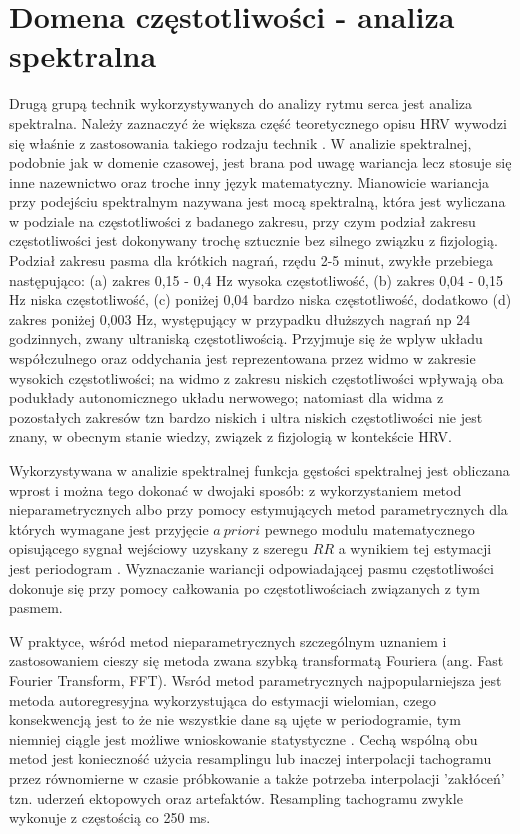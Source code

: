 \section{Domena częstotliwości - analiza spektralna}

Drugą grupą technik wykorzystywanych do analizy rytmu serca jest analiza
spektralna. Należy zaznaczyć że większa część teoretycznego opisu HRV wywodzi
się właśnie z zastosowania takiego rodzaju technik \cite{task2, hrv_origins, dynamicMalik}. 
W analizie spektralnej, podobnie jak w domenie czasowej, jest brana pod uwagę wariancja
lecz stosuje się inne nazewnictwo oraz troche inny język matematyczny.
Mianowicie wariancja przy podejściu spektralnym nazywana jest mocą spektralną, która jest 
wyliczana w podziale na częstotliwości z badanego zakresu, przy czym podział zakresu
częstotliwości jest dokonywany trochę sztucznie bez silnego związku z fizjologią. Podział
zakresu pasma dla krótkich nagrań, rzędu 2-5 minut, zwykłe przebiega następująco: (a) 
zakres 0,15 - 0,4 Hz wysoka częstotliwość, (b) zakres 0,04 - 0,15 Hz niska częstotliwość, (c)
poniżej 0,04 bardzo niska częstotliwość, dodatkowo (d) zakres poniżej 0,003 Hz,
występujący w przypadku dłuższych nagrań np 24 godzinnych, zwany ultraniską częstotliwością.
Przyjmuje się że wplyw układu współczulnego oraz oddychania \cite{task2, hrv_origins, dynamicMalik, Hainsworth} jest reprezentowana przez widmo w zakresie wysokich częstotliwości; na widmo z
zakresu niskich częstotliwości wpływają oba podukłady autonomicznego układu nerwowego; 
natomiast dla widma z pozostałych zakresów tzn bardzo niskich i ultra niskich częstotliwości
nie jest znany, w obecnym stanie wiedzy, związek z fizjologią w kontekście HRV. 

Wykorzystywana w analizie spektralnej funkcja gęstości spektralnej jest obliczana wprost i
można tego dokonać w dwojaki sposób: z wykorzystaniem metod nieparametrycznych albo przy
pomocy estymujących metod parametrycznych dla których wymagane jest przyjęcie $a\:priori$
pewnego modulu matematycznego opisującego sygnał wejściowy uzyskany z szeregu $RR$ a
wynikiem tej estymacji jest periodogram \cite{task2, hrv_origins, shumway, lomb_o, scargle, lombCasti, dsp_engel}. Wyznaczanie wariancji odpowiadającej pasmu
częstotliwości dokonuje się przy pomocy całkowania po częstotliwościach związanych z tym
pasmem. 

W praktyce, wśród metod nieparametrycznych szczególnym uznaniem i zastosowaniem cieszy się
metoda zwana szybką transformatą Fouriera (ang. Fast Fourier Transform, FFT). Wsród metod
parametrycznych najpopularniejsza jest metoda autoregresyjna wykorzystująca do estymacji
wielomian, czego konsekwencją jest to że nie wszystkie dane są ujęte w periodogramie, tym
niemniej ciągle jest możliwe wnioskowanie statystyczne \cite{task, hrv_origins, dsp_engel, lomb,scargle,lombCasti,shumway}. Cechą wspólną obu metod jest
konieczność użycia resamplingu lub inaczej interpolacji tachogramu przez równomierne w
czasie próbkowanie a także potrzeba interpolacji 'zakłóceń' tzn. uderzeń ektopowych oraz
artefaktów. Resampling tachogramu zwykle wykonuje z częstością co 250 ms.

